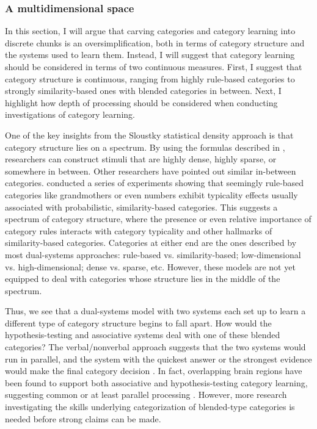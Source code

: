 \documentclass[../dissertation.tex]{subfiles}
\begin{document}
\subsubsection{A multidimensional space}
	In this section, I will argue that carving categories and category learning into discrete chunks is an oversimplification, both in terms of category structure and the systems used to learn them. Instead, I will suggest that category learning should be considered in terms of two continuous measures. First, I suggest that category structure is continuous, ranging from highly rule-based categories to strongly similarity-based ones with blended categories in between. Next, I highlight how depth of processing should be considered when conducting investigations of category learning. \par
	One of the key insights from the Sloustky statistical density approach is that category structure lies on a spectrum. By using the formulas described in \citet{Sloutsky2010}, researchers can construct stimuli that are highly dense, highly sparse, or somewhere in between. Other researchers have pointed out similar in-between categories. \citet{Lupyan2013a} conducted a series of experiments showing that seemingly rule-based categories like grandmothers or even numbers exhibit typicality effects usually associated with probabilistic, similarity-based categories. This suggests a spectrum of category structure, where the presence or even relative importance of category rules interacts with category typicality and other hallmarks of similarity-based categories. Categories at either end are the ones described by most dual-systems approaches: rule-based vs. similarity-based; low-dimensional vs. high-dimensional; dense vs. sparse, etc. However, these models are not yet equipped to deal with categories whose structure lies in the middle of the spectrum.  \par 
	Thus, we see that a dual-systems model with two systems each set up to learn a different type of category structure begins to fall apart. How would the hypothesis-testing and associative systems deal with one of these blended categories?  The verbal/nonverbal approach suggests that the two systems would run in parallel, and the system with the quickest answer or the strongest evidence would make the final category decision \citep{Minda2010}. In fact, overlapping brain regions have been found to support both associative and hypothesis-testing category learning, suggesting common or at least parallel processing \citep{Carpenter2016}. However, more research investigating the skills underlying categorization of blended-type categories is needed before strong claims can be made. \par 
\end{document}
